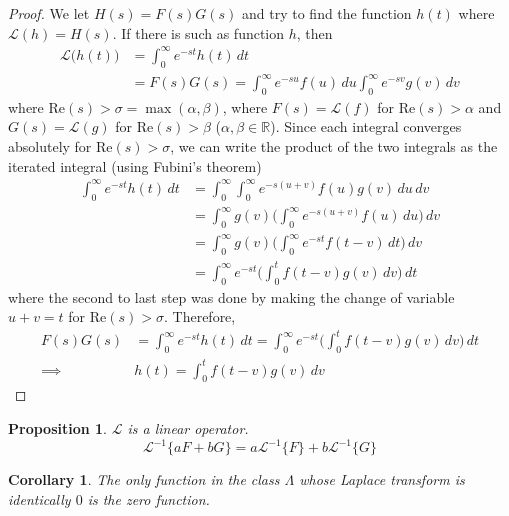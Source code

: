 \documentclass{article}
\newtheorem{proposition}[theorem]{Proposition}
\newtheorem{corollary}{Corollary}[theorem]
\theoremstyle{remark}
\theoremstyle{definition}
\begin{document}
    \begin{proof}
    We let $H(s) = F(s) G(s)$ and try to find the function $h(t)$ where $\mathcal{L}(h) = H(s)$. If there is such as function $h$, then 
    \begin{align*}
        \mathcal{L}\big(h(t)\big) & = \int_0^\infty e^{-st} h(t)\,dt \\
        & = F(s) G(s) = \int_0^\infty e^{-su} f(u) \,du \int_0^\infty e^{-sv} g(v)\,dv
    \end{align*}
    where Re$(s)>\sigma = \max{(\alpha, \beta)}$, where $F(s) = \mathcal{L}(f)$ for Re$(s)>\alpha$ and $G(s) = \mathcal{L}(g)$ for Re$(s)>\beta$ ($\alpha, \beta \in \mathbb{R}$). Since each integral converges absolutely for Re$(s) > \sigma$, we can write the product of the two integrals as the iterated integral (using Fubini's theorem) 
    \begin{align*}
        \int_0^\infty e^{-st} h(t) \,dt & = \int_0^\infty \int_0^\infty e^{-s(u+v)} f(u) g(v)\,du \,dv \\
        & = \int_0^\infty g(v) \bigg(\int_0^\infty e^{-s(u+v)} f(u)\,du\bigg)\,dv \\
        & = \int_0^\infty g(v) \bigg( \int_0^\infty e^{-st} f(t-v) \,dt \bigg)\,dv \\
        & = \int_0^\infty e^{-st} \bigg( \int_0^t f(t-v) g(v)\,dv \bigg) \,dt
    \end{align*}
    where the second to last step was done by making the change of variable $u+v = t$ for Re$(s) > \sigma$. Therefore, 
    \begin{align*}
        F(s) G(s) & = \int_0^\infty e^{-st} h(t) \,dt = \int_0^\infty e^{-st} \bigg( \int_0^t f(t-v) g(v)\,dv \bigg) \,dt \\
        \implies & h(t) = \int_0^t f(t-v) g(v)\,dv
    \end{align*}
    \end{proof}

    \begin{proposition}
    $\mathcal{L}$ is a linear operator. 
    \[\mathcal{L}^{-1} \{ a F + b G\} = a \mathcal{L}^{-1} \{F\} + b \mathcal{L}^{-1} \{G\}\]
    \end{proposition}

    \begin{corollary}
    The only function in the class $\Lambda$ whose Laplace transform is identically $0$ is the zero function. 
    \end{corollary}
\end{document}
